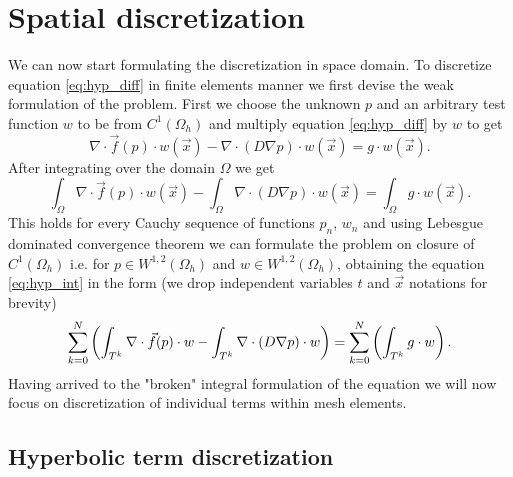 \newpage
\section{Spatial discretization}
We can now start formulating the discretization in space domain. To discretize
equation \eqref{eq:hyp_diff} in finite elements manner we first devise the weak
formulation of the problem. First we choose the unknown $p$ and an arbitrary test
function $w$ to be from $C^1(\Omega_h)$ and multiply equation
\eqref{eq:hyp_diff} by $w$ to get
\begin{equation}
\nabla\cdot \vec{f}(p)\cdot w(\vec{x})
-  \nabla \cdot (D \nabla p)\cdot w(
\vec{x}) = g\cdot w(\vec{x}).
\end{equation}
After integrating over the domain $\Omega$ we get
\begin{equation}
\label{eq:hyp_int}
\int_{\Omega}\nabla\cdot \vec{f}(p)\cdot w(\vec{x})
- \int_{\Omega}\nabla \cdot (D \nabla p)\cdot w(\vec{x})
= \int_{\Omega}g\cdot w(\vec{x}).
\end{equation}
This holds for every Cauchy sequence of functions ${p_n}$, ${w_n}$ and using
Lebesgue dominated convergence theorem we can formulate the problem on closure
of $C^1(\Omega_h)$ i.e. for $p \in W^{1,2}(\Omega_h)$ and  $w \in
W^{1,2}(\Omega_h)$, obtaining the equation \eqref{eq:hyp_int} in the form (we
drop
independent variables $t$ and $\vec{x}$ notations for brevity)
\begin{equation}
\label{eq:sum_int_hyp}
\sum\limits_{k=0}^{N}\left(
\int_{T^k}\nabla\cdot \vec{f}(p)\cdot w
- \int_{T^k}\nabla \cdot (D \nabla p)\cdot w
\right)
=\sum\limits_{k=0}^{N}\left(\int_{T^k} g\cdot w\right).
\end{equation}
Having arrived to the "broken" integral formulation of the equation we will now
focus on discretization of individual terms within mesh elements.

\subsection{Hyperbolic term discretization}
\label{se:hyp_term}

